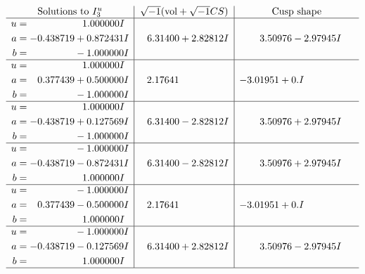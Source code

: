 \documentclass[1p]{elsarticle_modified}
\theoremstyle{definition}
\newcommand{\I}{\sqrt{-1}}
\begin{document}
$$\begin{array}{c|c|c}  
\text{Solutions to }I^u_{3}& \I (\text{vol} + \sqrt{-1}CS) & \text{Cusp shape}\\
 \hline 
\begin{aligned}
u &= \phantom{-0.000000 -}1.000000 I \\
a &= -0.438719 + 0.872431 I \\
b &= \phantom{-0.000000 } -1.000000 I\end{aligned}
 & \phantom{-}6.31400 + 2.82812 I & \phantom{-}3.50976 - 2.97945 I \\ \hline\begin{aligned}
u &= \phantom{-0.000000 -}1.000000 I \\
a &= \phantom{-}0.377439 + 0.500000 I \\
b &= \phantom{-0.000000 } -1.000000 I\end{aligned}
 & \phantom{-}2.17641\phantom{ +0.000000I} & -3.01951 + 0. I\phantom{ +0.000000I} \\ \hline\begin{aligned}
u &= \phantom{-0.000000 -}1.000000 I \\
a &= -0.438719 + 0.127569 I \\
b &= \phantom{-0.000000 } -1.000000 I\end{aligned}
 & \phantom{-}6.31400 - 2.82812 I & \phantom{-}3.50976 + 2.97945 I \\ \hline\begin{aligned}
u &= \phantom{-0.000000 } -1.000000 I \\
a &= -0.438719 - 0.872431 I \\
b &= \phantom{-0.000000 -}1.000000 I\end{aligned}
 & \phantom{-}6.31400 - 2.82812 I & \phantom{-}3.50976 + 2.97945 I \\ \hline\begin{aligned}
u &= \phantom{-0.000000 } -1.000000 I \\
a &= \phantom{-}0.377439 - 0.500000 I \\
b &= \phantom{-0.000000 -}1.000000 I\end{aligned}
 & \phantom{-}2.17641\phantom{ +0.000000I} & -3.01951 + 0. I\phantom{ +0.000000I} \\ \hline\begin{aligned}
u &= \phantom{-0.000000 } -1.000000 I \\
a &= -0.438719 - 0.127569 I \\
b &= \phantom{-0.000000 -}1.000000 I\end{aligned}
 & \phantom{-}6.31400 + 2.82812 I & \phantom{-}3.50976 - 2.97945 I\\
 \hline 
 \end{array}$$\newpage\newpage\renewcommand{\arraystretch}{1}
\end{document}
